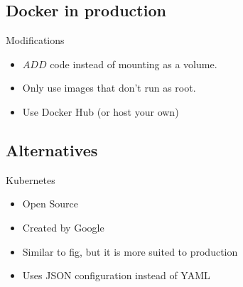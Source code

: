 \documentclass{beamer}
\begin{document}
    \subsection{Docker in production}
    \begin{frame}{Modifications}
        \begin{itemize}
            \item $ADD$ code instead of mounting as a volume.
            \item Only use images that don't run as root.
            \item Use Docker Hub (or host your own)
        \end{itemize}
    \end{frame}
    \subsection{Alternatives}
    \begin{frame}{Kubernetes}
        \begin{itemize}
            \item Open Source
            \item Created by Google
            \item Similar to fig, but it is more suited to production
            \item Uses JSON configuration instead of YAML
        \end{itemize}
    \end{frame}
\end{document}
